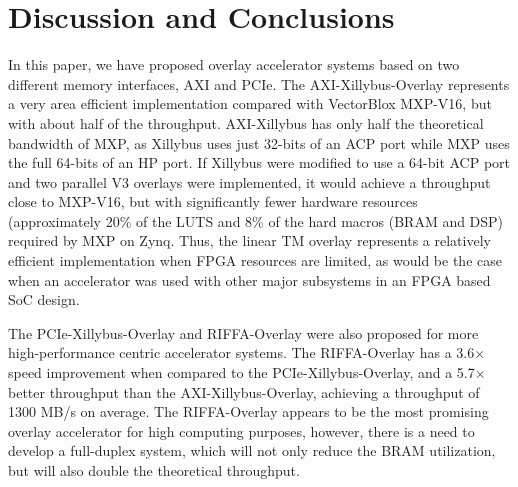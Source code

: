 \section{Discussion and Conclusions}
In this paper, we have proposed overlay accelerator systems based on two different memory interfaces, AXI and PCIe. 
The AXI-Xillybus-Overlay represents a very area efficient implementation compared with VectorBlox MXP-V16, but with about half of the throughput. 
AXI-Xillybus has only half the theoretical bandwidth of MXP, as Xillybus uses just 32-bits of an ACP port while MXP uses the full 64-bits of an HP port. 
If Xillybus were modified to use a 64-bit ACP port and two parallel V3 overlays were implemented, it would achieve a throughput close to MXP-V16, but with significantly fewer hardware resources (approximately 20\% of the LUTS and 8\% of the hard macros (BRAM and DSP) required by MXP on Zynq.
Thus, the linear TM overlay represents a relatively efficient implementation when FPGA resources are limited, as would be the case when an accelerator was used with other major subsystems in an FPGA based SoC design.

The PCIe-Xillybus-Overlay and RIFFA-Overlay were also proposed for more high-performance centric accelerator systems. 
The RIFFA-Overlay has a 3.6$\times$ speed improvement when compared to the PCIe-Xillybus-Overlay, and a 5.7$\times$ better throughput than the AXI-Xillybus-Overlay, achieving a throughput of 1300 MB/s on average. 
The RIFFA-Overlay appears to be the most promising overlay accelerator for high computing purposes, however, there is a need to develop a full-duplex system, which will not only reduce the BRAM utilization, but will also double the theoretical throughput.
